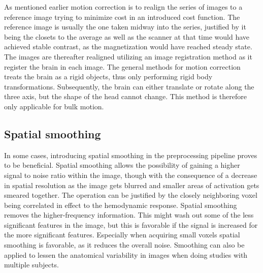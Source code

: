 As mentioned earlier motion correction is to realign the series of images to a reference image trying to minimize cost in an introduced cost function. The reference image is usually the one taken midway into the series, justified by it being the closets to the average as well as the scanner at that time would have achieved stable contrast, as the magnetization would have reached steady state. The images are thereafter realigned utilizing an image registration method as it register the brain in each image. The general methods for motion correction treats the brain as a rigid objects, thus only performing rigid body transformations. Subsequently, the brain can either translate or rotate along the three axis, but the shape of the head cannot change. This method is therefore only applicable for bulk motion. \cite{Poldrack2011} 

\subsection{Spatial smoothing}

In some cases, introducing spatial smoothing in the preprocessing pipeline proves to be beneficial. Spatial smoothing allows the possibility of gaining a higher signal to noise ratio within the image, though with the consequence of a decrease in spatial resolution as the image gets blurred and smaller areas of activation gets smeared together. The operation can be justified by the closely neighboring voxel being correlated in effect to the hemodynamic response. Spatial smoothing removes the higher-frequency information. This might wash out some of the less significant features in the image, but this is favorable if the signal is increased for the more significant features. Especially when acquiring small voxels spatial smoothing is favorable, as it reduces the overall noise. Smoothing can also be applied to lessen the anatomical variability in images when doing studies with multiple subjects. \cite{Poldrack2011}

